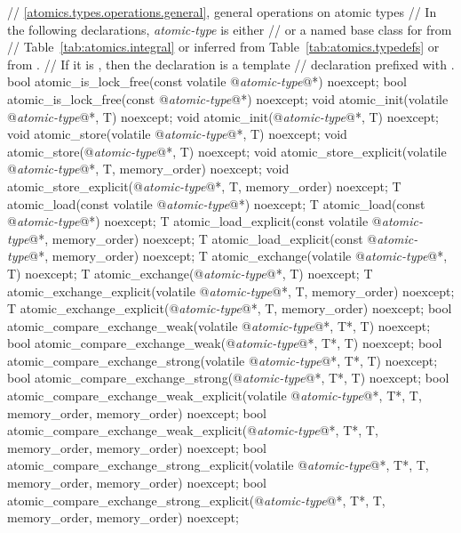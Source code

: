 \begin{codeblock}
{  // \ref{atomics.types.operations.general}, general operations on atomic types
  //  In the following declarations, \textit{atomic-type} is either
  //   or a named base class for  from
  //  Table~\ref{tab:atomics.integral} or inferred from Table~\ref{tab:atomics.typedefs} or from .
  // If it is , then the declaration is a template
  // declaration prefixed with .
  bool atomic_is_lock_free(const volatile @\textit{atomic-type}@*) noexcept;
  bool atomic_is_lock_free(const @\textit{atomic-type}@*) noexcept;
  void atomic_init(volatile @\textit{atomic-type}@*, T) noexcept;
  void atomic_init(@\textit{atomic-type}@*, T) noexcept;
  void atomic_store(volatile @\textit{atomic-type}@*, T) noexcept;
  void atomic_store(@\textit{atomic-type}@*, T) noexcept;
  void atomic_store_explicit(volatile @\textit{atomic-type}@*, T, memory_order) noexcept;
  void atomic_store_explicit(@\textit{atomic-type}@*, T, memory_order) noexcept;
  T atomic_load(const volatile @\textit{atomic-type}@*) noexcept;
  T atomic_load(const @\textit{atomic-type}@*) noexcept;
  T atomic_load_explicit(const volatile @\textit{atomic-type}@*, memory_order) noexcept;
  T atomic_load_explicit(const @\textit{atomic-type}@*, memory_order) noexcept;
  T atomic_exchange(volatile @\textit{atomic-type}@*, T) noexcept;
  T atomic_exchange(@\textit{atomic-type}@*, T) noexcept;
  T atomic_exchange_explicit(volatile @\textit{atomic-type}@*, T, memory_order) noexcept;
  T atomic_exchange_explicit(@\textit{atomic-type}@*, T, memory_order) noexcept;
  bool atomic_compare_exchange_weak(volatile @\textit{atomic-type}@*, T*, T) noexcept;
  bool atomic_compare_exchange_weak(@\textit{atomic-type}@*, T*, T) noexcept;
  bool atomic_compare_exchange_strong(volatile @\textit{atomic-type}@*, T*, T) noexcept;
  bool atomic_compare_exchange_strong(@\textit{atomic-type}@*, T*, T) noexcept;
  bool atomic_compare_exchange_weak_explicit(volatile @\textit{atomic-type}@*, T*, T, 
    memory_order, memory_order) noexcept;
  bool atomic_compare_exchange_weak_explicit(@\textit{atomic-type}@*, T*, T,
    memory_order, memory_order) noexcept;
  bool atomic_compare_exchange_strong_explicit(volatile @\textit{atomic-type}@*, T*, T,
    memory_order, memory_order) noexcept;
  bool atomic_compare_exchange_strong_explicit(@\textit{atomic-type}@*, T*, T,
    memory_order, memory_order) noexcept;

}
\end{codeblock}
